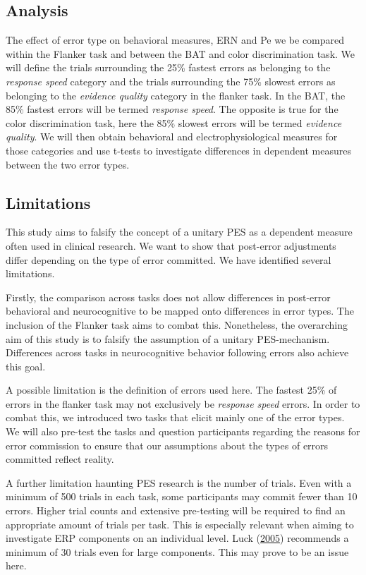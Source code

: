 \documentclass[
  man,floatsintext]{apa7}
\begin{document}
\hypertarget{analysis}{%
\subsection{Analysis}\label{analysis}}

The effect of error type on behavioral measures, ERN and Pe we be compared within the Flanker task and between the BAT and color discrimination task. We will define the trials surrounding the 25\% fastest errors as belonging to the \emph{response speed} category and the trials surrounding the 75\% slowest errors as belonging to the \emph{evidence quality} category in the flanker task. In the BAT, the 85\% fastest errors will be termed \emph{response speed}. The opposite is true for the color discrimination task, here the 85\% slowest errors will be termed \emph{evidence quality}. We will then obtain behavioral and electrophysiological measures for those categories and use t-tests to investigate differences in dependent measures between the two error types.

\hypertarget{limitations}{%
\subsection{Limitations}\label{limitations}}

This study aims to falsify the concept of a unitary PES as a dependent measure often used in clinical research. We want to show that post-error adjustments differ depending on the type of error committed. We have identified several limitations.

Firstly, the comparison across tasks does not allow differences in post-error behavioral and neurocognitive to be mapped onto differences in error types. The inclusion of the Flanker task aims to combat this. Nonetheless, the overarching aim of this study is to falsify the assumption of a unitary PES-mechanism. Differences across tasks in neurocognitive behavior following errors also achieve this goal.

A possible limitation is the definition of errors used here. The fastest 25\% of errors in the flanker task may not exclusively be \emph{response speed} errors. In order to combat this, we introduced two tasks that elicit mainly one of the error types. We will also pre-test the tasks and question participants regarding the reasons for error commission to ensure that our assumptions about the types of errors committed reflect reality.

A further limitation haunting PES research is the number of trials. Even with a minimum of 500 trials in each task, some participants may commit fewer than 10 errors. Higher trial counts and extensive pre-testing will be required to find an appropriate amount of trials per task. This is especially relevant when aiming to investigate ERP components on an individual level. Luck (\protect\hyperlink{ref-luck2005ten}{2005}) recommends a minimum of 30 trials even for large components. This may prove to be an issue here.
\end{document}
